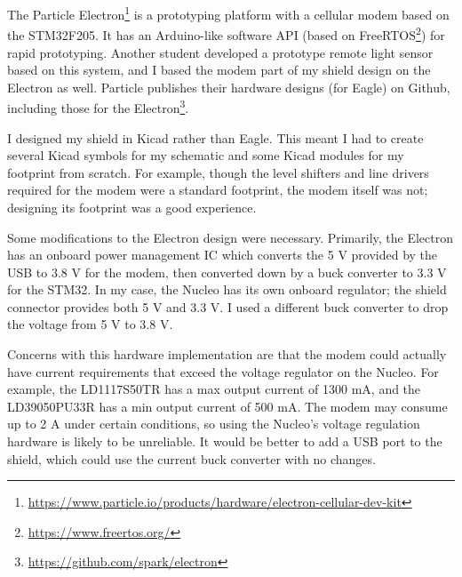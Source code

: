 \documentclass{article}
\begin{document}
The Particle Electron\footnote{\url{https://www.particle.io/products/hardware/electron-cellular-dev-kit}} is a prototyping platform with a cellular modem based on the STM32F205. It has an Arduino-like software API (based on FreeRTOS\footnote{\url{https://www.freertos.org/}}) for rapid prototyping. Another student developed a prototype remote light sensor based on this system, and I based the modem part of my shield design on the Electron as well. Particle publishes their hardware designs (for Eagle) on Github, including those for the Electron\footnote{\url{https://github.com/spark/electron}}.

I designed my shield in Kicad rather than Eagle. This meant I had to create several Kicad symbols for my schematic and some Kicad modules for my footprint from scratch. For example, though the level shifters and line drivers required for the modem were a standard footprint, the modem itself was not; designing its footprint was a good experience.

Some modifications to the Electron design were necessary. Primarily, the Electron has an onboard power management IC which converts the 5 V provided by the USB to 3.8 V for the modem, then converted down by a buck converter to 3.3 V for the STM32. In my case, the Nucleo has its own onboard regulator; the shield connector provides both 5 V and 3.3 V. I used a different buck converter to drop the voltage from 5 V to 3.8 V.

Concerns with this hardware implementation are that the modem could actually have current requirements that exceed the voltage regulator on the Nucleo. For example, the LD1117S50TR has a max output current of 1300 mA, and the LD39050PU33R has a min output current of 500 mA. The modem may consume up to 2 A under certain conditions, so using the Nucleo's voltage regulation hardware is likely to be unreliable. It would be better to add a USB port to the shield, which could use the current buck converter with no changes.
\end{document}
